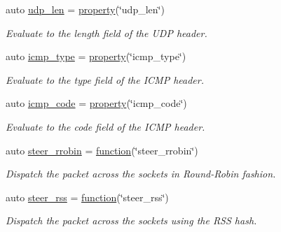 \begin{DoxyCompactItemize}
auto \hyperlink{namespacepfq_1_1lang_1_1anonymous__namespace_02default_8hpp_03_ac7f1ef80a8ec46ce01aa12f66cfee86b}{udp\+\_\+len} = \hyperlink{namespacepfq_1_1lang_a1249450e72229273b0db707a286aea91}{property}(\char`\"{}udp\+\_\+len\char`\"{})
\begin{DoxyCompactList}\small\item\em Evaluate to the {\ttfamily length} field of the U\+DP header. \end{DoxyCompactList}\item 
auto \hyperlink{namespacepfq_1_1lang_1_1anonymous__namespace_02default_8hpp_03_a0c15abbec8753be8bb160633f697ed4b}{icmp\+\_\+type} = \hyperlink{namespacepfq_1_1lang_a1249450e72229273b0db707a286aea91}{property}(\char`\"{}icmp\+\_\+type\char`\"{})
\begin{DoxyCompactList}\small\item\em Evaluate to the {\ttfamily type} field of the I\+C\+MP header. \end{DoxyCompactList}\item 
auto \hyperlink{namespacepfq_1_1lang_1_1anonymous__namespace_02default_8hpp_03_a026262dd85de1db88a8303ed0f3dac18}{icmp\+\_\+code} = \hyperlink{namespacepfq_1_1lang_a1249450e72229273b0db707a286aea91}{property}(\char`\"{}icmp\+\_\+code\char`\"{})
\begin{DoxyCompactList}\small\item\em Evaluate to the {\ttfamily code} field of the I\+C\+MP header. \end{DoxyCompactList}\item 
auto \hyperlink{namespacepfq_1_1lang_1_1anonymous__namespace_02default_8hpp_03_a98f503710ebfe66f6866d642af30b1a8}{steer\+\_\+rrobin} = \hyperlink{namespacepfq_1_1lang_a1a4638059d700ae08d0ca63886ff2bb3}{function}(\char`\"{}steer\+\_\+rrobin\char`\"{})
\begin{DoxyCompactList}\small\item\em Dispatch the packet across the sockets in Round-\/\+Robin fashion. \end{DoxyCompactList}\item 
auto \hyperlink{namespacepfq_1_1lang_1_1anonymous__namespace_02default_8hpp_03_ae5f71a205afe1a8e3ed959d4c555fcb9}{steer\+\_\+rss} = \hyperlink{namespacepfq_1_1lang_a1a4638059d700ae08d0ca63886ff2bb3}{function}(\char`\"{}steer\+\_\+rss\char`\"{})
\begin{DoxyCompactList}\small\item\em Dispatch the packet across the sockets using the R\+SS hash. \end{DoxyCompactList}\item 

\end{DoxyCompactItemize}
